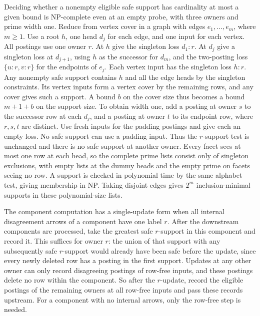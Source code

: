 Deciding whether a nonempty eligible safe support
has cardinality at most a given bound is NP-complete
even at an empty probe, with three owners and
prime width one. Reduce from vertex
cover in a graph with edges $e_1,\ldots,e_m$,
where $m\ge1$. Use a root $h$, one head $d_j$
for each edge, and one input for each vertex.
All postings use one owner $r$. At $h$ give
the singleton loss $d_1:r$. At $d_j$ give a
singleton loss at $d_{j+1}$, using $h$ as the
successor for $d_m$, and the two-posting loss
$\{u:r,v:r\}$ for the endpoints of $e_j$.
Each vertex input has the singleton loss $h:r$.
Any nonempty safe support contains $h$ and
all the edge heads by the singleton constraints.
Its vertex inputs form a vertex cover by the
remaining rows, and any cover gives such a
support. A bound $b$ on the cover size thus
becomes a bound $m+1+b$ on the support size.
To obtain width one, add a posting at owner $s$
to the successor row at each $d_j$, and a
posting at owner $t$ to its endpoint row, where
$r,s,t$ are distinct. Use fresh inputs for the
padding postings and give each an empty loss.
No safe support can use a padding input. Thus
the $r$-support test is unchanged and there
is no safe support at another owner. Every
facet sees at most one row at each head, so
the complete prime lists consist only of
singleton exclusions, with empty lists at
the dummy heads and the empty prime on facets
seeing no row. A support is checked in polynomial
time by the same alphabet test, giving membership
in NP.
Taking disjoint edges gives $2^m$ inclusion-minimal
supports in these polynomial-size lists.

The component computation has a single-update
form when all internal disagreement arrows of a
component have one label $r$. After the downstream
components are processed, take the greatest safe
$r$-support in this component and record it.
This suffices for owner $r$: the union of that
support with any subsequently safe $r$-support
would already have been safe before the update,
since every newly deleted row has a posting in
the first support. Updates at any other owner
can only record disagreeing postings of
row-free inputs, and these postings delete no
row within the component. So after the $r$-update,
record the eligible postings of the remaining
owners at all row-free inputs and pass these
records upstream. For a component with no internal
arrows, only the row-free step is needed.

